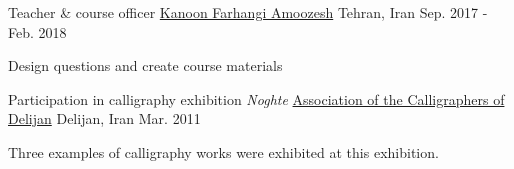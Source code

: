 \begin{cventries}
  \cventry
  {Teacher \& course officer} %
  {\href{http://www.kanoon.ir/}{Kanoon Farhangi Amoozesh}} %
  {Tehran, Iran} %
  {Sep. 2017 - Feb. 2018} %
  {
    \begin{cvitems} %
      \item {Design questions and create course materials}
    \end{cvitems}
  }

  \cventry
  {Participation in calligraphy exhibition \emph{Noghte}} %
  {\href{http://calligraphers.ir/}{Association of the Calligraphers of Delijan}} %
  {Delijan, Iran} %
  {Mar. 2011} %
  {
    \begin{cvitems} %
      \item {Three examples of calligraphy works were exhibited at this exhibition.}
    \end{cvitems}
  }

\end{cventries}
